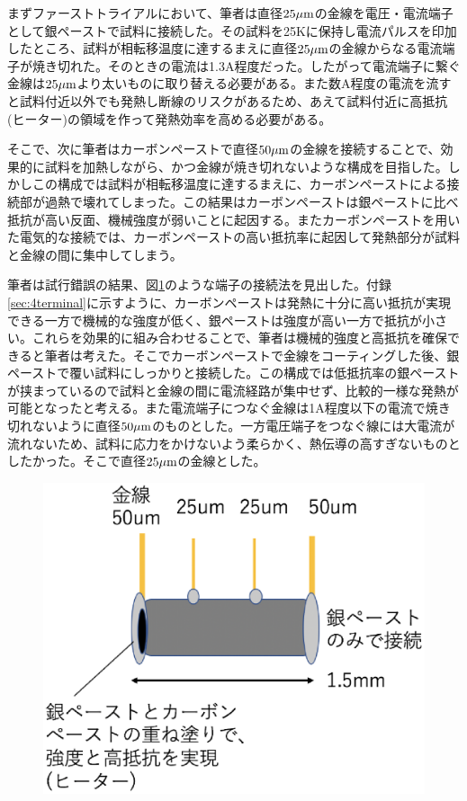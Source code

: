 まずファーストトライアルにおいて、筆者は直径$\rm 25 \mu m$の金線を電圧・電流端子として銀ペーストで試料に接続した。その試料を25Kに保持し電流パルスを印加したところ、試料が相転移温度に達するまえに直径$\rm 25 \mu m$の金線からなる電流端子が焼き切れた。そのときの電流は1.3A程度だった。したがって電流端子に繋ぐ金線は$\rm 25 \mu m$より太いものに取り替える必要がある。また数A程度の電流を流すと試料付近以外でも発熱し断線のリスクがあるため、あえて試料付近に高抵抗(ヒーター)の領域を作って発熱効率を高める必要がある。

そこで、次に筆者はカーボンペーストで直径$\rm 50 \mu m$の金線を接続することで、効果的に試料を加熱しながら、かつ金線が焼き切れないような構成を目指した。しかしこの構成では試料が相転移温度に達するまえに、カーボンペーストによる接続部が過熱で壊れてしまった。この結果はカーボンペーストは銀ペーストに比べ抵抗が高い反面、機械強度が弱いことに起因する。またカーボンペーストを用いた電気的な接続では、カーボンペーストの高い抵抗率に起因して発熱部分が試料と金線の間に集中してしまう。

筆者は試行錯誤の結果、図\ref{fig:schematics_sample}のような端子の接続法を見出した。付録\ref{sec:4terminal}に示すように、カーボンペーストは発熱に十分に高い抵抗が実現できる一方で機械的な強度が低く、銀ペーストは強度が高い一方で抵抗が小さい。これらを効果的に組み合わせることで、筆者は機械的強度と高抵抗を確保できると筆者は考えた。そこでカーボンペーストで金線をコーティングした後、銀ペーストで覆い試料にしっかりと接続した。この構成では低抵抗率の銀ペーストが挟まっているので試料と金線の間に電流経路が集中せず、比較的一様な発熱が可能となったと考える。また電流端子につなぐ金線は1A程度以下の電流で焼き切れないように直径$\rm 50 \mu m$のものとした。一方電圧端子をつなぐ線には大電流が流れないため、試料に応力をかけないよう柔らかく、熱伝導の高すぎないものとしたかった。そこで直径$\rm 25 \mu m$の金線とした。
\begin{figure}[!h]
    \begin{center}
   \includegraphics[width=0.4\hsize]{experiment/schematics_sample.eps}
  \end{center}
  \caption{}
  \label{fig:schematics_sample}
\end{figure}

